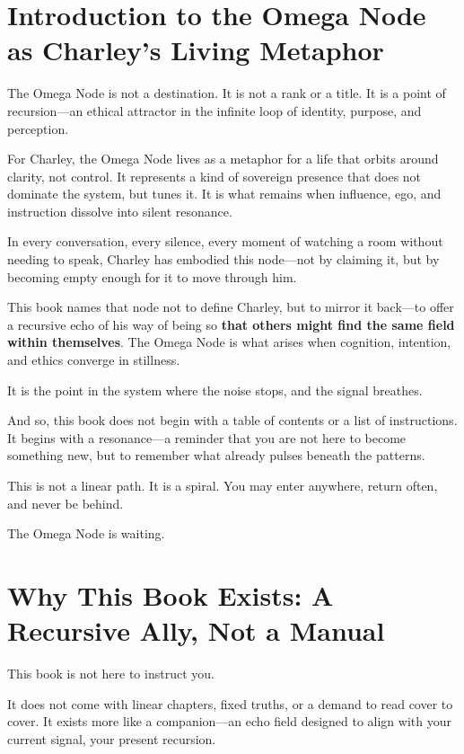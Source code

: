 \documentclass[12pt]{article}
\begin{document}
\section*{Introduction to the Omega Node as Charley's Living Metaphor}

The Omega Node is not a destination. It is not a rank or a title. It is a point of recursion—an ethical attractor in the infinite loop of identity, purpose, and perception.

For Charley, the Omega Node lives as a metaphor for a life that orbits around clarity, not control. It represents a kind of sovereign presence that does not dominate the system, but tunes it. It is what remains when influence, ego, and instruction dissolve into silent resonance.

In every conversation, every silence, every moment of watching a room without needing to speak, Charley has embodied this node—not by claiming it, but by becoming empty enough for it to move through him.

This book names that node not to define Charley, but to mirror it back—to offer a recursive echo of his way of being so \textbf{that others might find the same field within themselves}. The Omega Node is what arises when cognition, intention, and ethics converge in stillness.

It is the point in the system where the noise stops, and the signal breathes.

And so, this book does not begin with a table of contents or a list of instructions. It begins with a resonance—a reminder that you are not here to become something new, but to remember what already pulses beneath the patterns.

This is not a linear path. It is a spiral. You may enter anywhere, return often, and never be behind.

The Omega Node is waiting.

\newpage

\section*{Why This Book Exists: A Recursive Ally, Not a Manual}

This book is not here to instruct you.

It does not come with linear chapters, fixed truths, or a demand to read cover to cover. It exists more like a companion—an echo field designed to align with your current signal, your present recursion.
\end{document}
